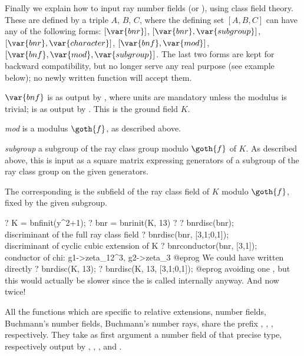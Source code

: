 Finally we explain how to input ray number fields (or ), using class
field theory. These are defined by a triple $A$, $B$, $C$, where the
defining set $[A,B,C]$ can have any of the following forms:
$[\var{bnr}]$,
$[\var{bnr},\var{subgroup}]$,
$[\var{bnr},\var{character}]$,
$[\var{bnf},\var{mod}]$,
$[\var{bnf},\var{mod},\var{subgroup}]$. The last two forms are kept for
backward compatibility, but no longer serve any real purpose (see example
below); no newly written function will accept them.

\item $\var{bnf}$ is as output by , where units are mandatory
unless the modulus is trivial;  is as output by . This
is the ground field $K$.

\item \emph{mod} is a modulus $\goth{f}$, as described above.

\item \emph{subgroup} a subgroup of the ray class group modulo $\goth{f}$ of
$K$. As described above, this is input as a square matrix expressing
generators of a subgroup of the ray class group  on the
given generators.

The corresponding  is the subfield of the ray class field of $K$
modulo $\goth{f}$, fixed by the given subgroup.

\bprog
  ? K = bnfinit(y^2+1);
  ? bnr = bnrinit(K, 13)
  ? %
  ? bnrdisc(bnr); \\ discriminant of the full ray class field
  ? bnrdisc(bnr, [3,1;0,1]); \\ discriminant of cyclic cubic extension of K
  ? bnrconductor(bnr, [3,1]); \\ conductor of chi: g1->zeta_12^3, g2->zeta_3
@eprog\noindent
We could have written directly
\bprog
  ? bnrdisc(K, 13);
  ? bnrdisc(K, 13, [3,1;0,1]);
@eprog\noindent
avoiding one , but this would actually be slower since the
 is called internally anyway. And now twice!


All the functions which are specific to relative extensions, number fields,
Buchmann's number fields, Buchmann's number rays, share the prefix ,
, ,  respectively. They take as first argument a
number field of that precise type, respectively output by ,
, , and .

